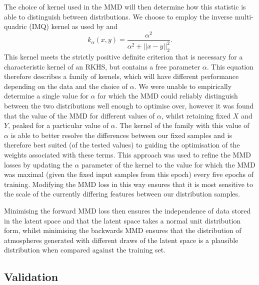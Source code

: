 The choice of kernel used in the MMD will then determine how this statistic is able to distinguish between distributions.
We choose to employ the inverse multi-quadric (IMQ) kernel as used by \citet{2017Tolstikhin} and \citet{2018Ardizzone}
\begin{equation}
    k_\alpha(x, y) = \frac{\alpha^2}{\alpha^2 + ||x-y||_2^2}.
\end{equation}
This kernel meets the strictly positive definite criterion that is necessary for a characteristic kernel of an RKHS, but contains a free parameter $\alpha$.
This equation therefore describes a family of kernels, which will have different performance depending on the data and the choice of $\alpha$.
We were unable to empirically determine a single value for $\alpha$ for which the MMD could reliably distinguish between the two distributions well enough to optimise over, however it was found that the value of the MMD for different values of $\alpha$, whilst retaining fixed $X$ and $Y$, peaked for a particular value of $\alpha$.
The kernel of the family with this value of $\alpha$ is able to better resolve the differences between our fixed samples and is therefore best suited (of the tested values) to guiding the optimisation of the weights associated with these terms.
This approach was used to refine the MMD losses by updating the $\alpha$ parameter of the kernel to the value for which the MMD was maximal (given the fixed input samples from this epoch) every five epochs of training.
Modifying the MMD loss in this way ensures that it is most sensitive to the scale of the currently differing features between our distribution samples.

Minimising the forward MMD loss then ensures the independence of data stored in the latent space and that the latent space takes a normal unit distribution form, whilst minimising the backwards MMD ensures that the distribution of atmospheres generated with different draws of the latent space is a plausible distribution when compared against the training set.

\subsection{Validation}

